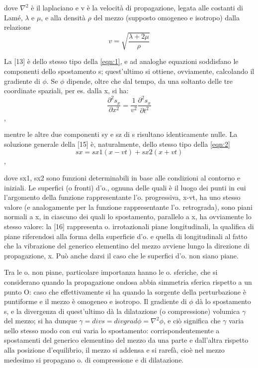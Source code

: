 \documentclass[a4paper]{article}
\begin{document}
dove $\nabla^2$ è il laplaciano e v è la velocità di propagazione, legata alle costanti di Lamé, $\lambda$ e $\mu$, e alla densità $\rho$ del mezzo (supposto omogeneo e isotropo) dalla relazione 
\begin{equation}
v=\sqrt{\frac{\lambda+2\mu}{\rho}}
\end{equation}

La [13] è dello stesso tipo della \eqref{eqn:1}, e ad analoghe equazioni soddisfano le componenti dello spostamento s; quest'ultimo si ottiene, ovviamente, calcolando il gradiente di $\phi$. Se $\phi$ dipende, oltre che dal tempo, da una soltanto delle tre coordinate spaziali, per es. dalla x, si ha:
\begin{equation}
\frac{\partial^2 s_x}{\partial x^2}=\frac{1}{v^2}\frac{\partial^2 s_x}{\partial t^2}
\end{equation},

mentre le altre due componenti sy e sz di s risultano identicamente nulle. La soluzione generale della [15] è, naturalmente, dello stesso tipo della \eqref{eqn:2}
\begin{equation}
sx = sx1(x - vt) + sx2(x + vt)
\end{equation},

dove sx1, sx2 sono funzioni determinabili in base alle condizioni al contorno e iniziali. Le superfici (o fronti) d'o., ognuna delle quali è il luogo dei punti in cui l'argomento della funzione rappresentante l'o. progressiva, x-vt, ha uno stesso valore (e analogamente per la funzione rappresentante l'o. retrograda), sono piani normali a x, in ciascuno dei quali lo spostamento, parallelo a x, ha ovviamente lo stesso valore: la [16] rappresenta o. irrotazionali piane longitudinali, la qualifica di piane riferendosi alla forma della superficie d'o. e quella di longitudinali al fatto che la vibrazione del generico elementino del mezzo avviene lungo la direzione di propagazione, x. Può anche darsi il caso che le superfici d'o. non siano piane.

Tra le o. non piane, particolare importanza hanno le o. sferiche, che si considerano quando la propagazione ondosa abbia simmetria sferica rispetto a un punto O: caso che effettivamente si ha quando la sorgente della perturbazione è puntiforme e il mezzo è omogeneo e isotropo. Il gradiente di $\phi$ dà lo spostamento s, e la divergenza di quest'ultimo dà la dilatazione (o compressione) volumica $\gamma$ del mezzo; si ha dunque $\gamma=div s=div grad \phi=\nabla^2 \phi$, e ciò significa che $\gamma$ varia nello stesso modo con cui varia lo spostamento: corrispondentemente a spostamenti del generico elementino del mezzo da una parte e dall'altra rispetto alla posizione d'equilibrio, il mezzo si addensa e si rarefà, cioè nel mezzo medesimo si propagano o. di compressione e di dilatazione. 
\end{document}
